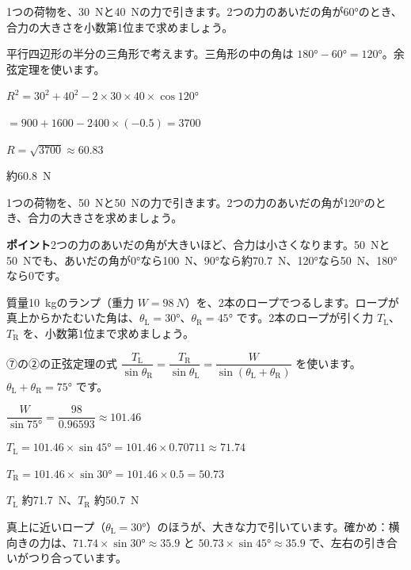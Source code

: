 \begin{reidai}[合力の大きさ]
1つの荷物を、\qty{30}{N}と\qty{40}{N}の力で引きます。2つの力のあいだの角が\ang{60}のとき、合力の大きさを小数第1位まで求めましょう。\par
\kangaekata 平行四辺形の半分の三角形で考えます。三角形の中の角は $\ang{180}-\ang{60}=\ang{120}$。余弦定理を使います。\par
\shiki $R^2=30^2+40^2-2\times30\times40\times\cos\ang{120}$\par
\hspace*{4.6\zw}$=900+1600-2400\times(-0.5)=3700$\par
\hspace*{2.6\zw}$R=\sqrt{3700}\approx60.83$\par
\kotae 約\qty{60.8}{N}
\end{reidai}

\begin{jibun}
1つの荷物を、\qty{50}{N}と\qty{50}{N}の力で引きます。2つの力のあいだの角が\ang{120}のとき、合力の大きさを求めましょう。
\end{jibun}
\textbf{ポイント}\quad 2つの力のあいだの角が大きいほど、合力は小さくなります。\qty{50}{N}と\qty{50}{N}でも、あいだの角が\ang{0}なら\qty{100}{N}、\ang{90}なら約\qty{70.7}{N}、\ang{120}なら\qty{50}{N}、\ang{180}なら0です。

\begin{reidai}[2本のロープでつるす]
質量\qty{10}{kg}のランプ（重力 $W=\qty{98}{N}$）を、2本のロープでつるします。ロープが真上からかたむいた角は、$\theta_{\mathrm{L}}=\ang{30}$、$\theta_{\mathrm{R}}=\ang{45}$ です。2本のロープが引く力 $T_{\mathrm{L}}$、$T_{\mathrm{R}}$ を、小数第1位まで求めましょう。\par
\kangaekata ⑦の②の正弦定理の式 $\dfrac{T_{\mathrm{L}}}{\sin\theta_{\mathrm{R}}}=\dfrac{T_{\mathrm{R}}}{\sin\theta_{\mathrm{L}}}=\dfrac{W}{\sin(\theta_{\mathrm{L}}+\theta_{\mathrm{R}})}$ を使います。$\theta_{\mathrm{L}}+\theta_{\mathrm{R}}=\ang{75}$ です。\par
\shiki $\dfrac{W}{\sin\ang{75}}=\dfrac{98}{0.96593}\approx101.46$\par
\hspace*{2.6\zw}$T_{\mathrm{L}}=101.46\times\sin\ang{45}=101.46\times0.70711\approx71.74$\par
\hspace*{2.6\zw}$T_{\mathrm{R}}=101.46\times\sin\ang{30}=101.46\times0.5=50.73$\par
\kotae $T_{\mathrm{L}}$ 約\qty{71.7}{N}、$T_{\mathrm{R}}$ 約\qty{50.7}{N}
\end{reidai}
真上に近いロープ（$\theta_{\mathrm{L}}=\ang{30}$）のほうが、大きな力で引いています。確かめ：横向きの力は、$71.74\times\sin\ang{30}\approx35.9$ と $50.73\times\sin\ang{45}\approx35.9$ で、左右の引き合いがつり合っています。

